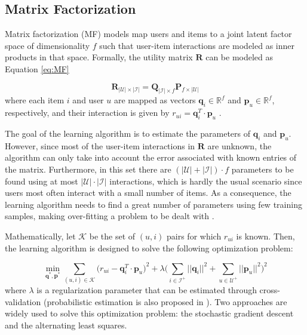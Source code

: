 \subsection{Matrix Factorization}

    Matrix factorization (MF)  models map users and items to a joint latent factor space of dimensionality $f$ such that user-item interactions are modeled as inner products in that space. Formally, the utility matrix $\mathbf{R}$ can be modeled as Equation \ref{eq:MF}
    
    \begin{equation}
        \label{eq:MF}
        \mathbf{R_{|\mathcal{U}| \times |\mathcal{I}|}} = \mathbf{Q}_{|\mathcal{I}| \times f} \mathbf{P}_{f \times |\mathcal{U}|} 
    \end{equation} where each item $i$ and user $u$ are mapped as vectors $\mathbf{q}_i \in \mathbb{R}^f$ and $\mathbf{p}_u \in \mathbb{R}^f$, respectively, and their interaction is given by $r_{ui} = \mathbf{q}^T_i \cdot \mathbf{p}_u$ \cite{2009MFTechniques}.
    
    The goal of the learning algorithm is to estimate the parameters of  $\mathbf{q}_i$ and $\mathbf{p}_u$. However, since most of the user-item interactions in $\mathbf{R}$ are unknown, the algorithm can only take into account the error associated with known entries of the matrix. Furthermore, in this set there are $(|\mathcal{U}|+|\mathcal{I}|)\cdot f$ parameters to be found using at most $|\mathcal{U}|\cdot |\mathcal{I}|$ interactions, which is hardly the usual scenario since users most often interact with a small number of items. As a consequence, the learning algorithm needs to find a great number of parameters using few training samples, making over-fitting a problem to be dealt with \cite{2008ALSWR}.
    
    Mathematically, let $\mathcal{K}$ be the set of $(u,i)$ pairs for which $r_{ui}$ is known. Then, the learning algorithm is designed to solve the following optimization problem: 
    
    \begin{equation}
        \label{eq:mf_min}
        \min_{\mathbf{q}^*, \mathbf{p}^*} \sum_{(u,i) \in \mathcal{K}} \bigg(r_{ui} - \mathbf{q}^T_i \cdot \mathbf{p}_u\bigg)^2 + \lambda \bigg(\sum_{i \in \mathcal{I}^+}||\mathbf{q}_i||^2 + \sum_{u \in \mathcal{U}^+}||\mathbf{p}_u||^2 \bigg)^2
    \end{equation} where $\lambda$ is a regularization parameter that can be estimated through cross-validation (probabilistic estimation is also proposed in \cite{2007ProbMF}). Two approaches are widely used to solve this optimization problem: the stochastic gradient descent and the alternating least squares. 
    

